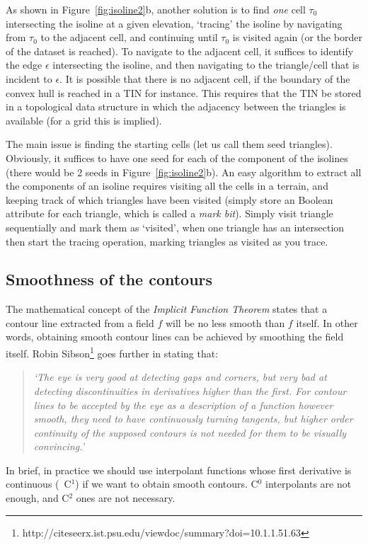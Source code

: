 %

As shown in Figure~\ref{fig:isoline2}b, another solution is to find \emph{one} cell $\tau_0$ intersecting the isoline at a given elevation, `tracing' the isoline by navigating from $\tau_0$ to the adjacent cell, and continuing until $\tau_0$ is visited again (or the border of the dataset is reached).
To navigate to the adjacent cell, it suffices to identify the edge $\epsilon$ intersecting the isoline, and then navigating to the triangle/cell that is incident to $\epsilon$.
It is possible that there is no adjacent cell, if the boundary of the convex hull is reached in a TIN for instance.
This requires that the TIN be stored in a topological data structure in which the adjacency between the triangles is available (for a grid this is implied).

The main issue is finding the starting cells (let us call them seed triangles).
Obviously, it suffices to have one seed for each of the component of the isolines (there would be 2 seeds in Figure~\ref{fig:isoline2}b).
An easy algorithm to extract all the components of an isoline requires visiting all the cells in a terrain, and keeping track of which triangles have been visited (simply store an Boolean attribute for each triangle, which is called a \emph{mark bit}).
Simply visit triangle sequentially and mark them as `visited', when one triangle has an intersection then start the tracing operation, marking triangles as visited as you trace. 


\subsection{Smoothness of the contours}
\label{sec:smoothness-contours}

The mathematical concept of the \emph{Implicit Function Theorem} states that a contour line extracted from a field $f$ will be no less smooth than $f$ itself.
In other words, obtaining smooth contour lines can be achieved by smoothing the field itself.
Robin Sibson\footnote{http://citeseerx.ist.psu.edu/viewdoc/summary?doi=10.1.1.51.63} goes further in stating that:
\begin{quote}
  \emph{`The eye is very good at detecting gaps and corners, but very bad at detecting discontinuities in derivatives higher than the first. 
  For contour lines to be accepted by the eye as a description of a function however smooth, they need to have continuously turning tangents, but higher order continuity of the supposed contours is not needed for them to be visually convincing.'}
\end{quote}
In brief, in practice we should use interpolant functions whose first derivative is continuous (\ie\ C$^1$) if we want to obtain smooth contours. 
C$^0$ interpolants are not enough, and C$^2$ ones are not necessary.


